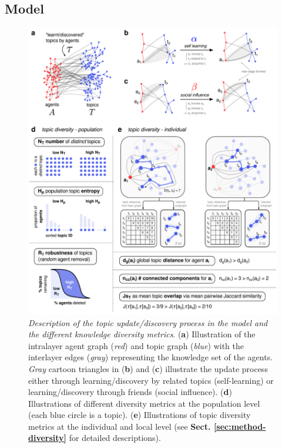 \documentclass{svproc}
\begin{document}
\subsection{Model} \label{sec:method-model}

\begin{figure}[!ht]
    \centering
    \includegraphics[width=\textwidth]{Fig1.pdf}
    \caption{
    \textit{Description of the topic update/discovery process in the model and the different knowledge diversity metrics}.
    (\textbf{a}) Illustration of the intralayer agent graph (\textit{red}) and topic graph (\textit{blue}) with the interlayer edges (\textit{gray}) representing the knowledge set of the agents.
    \textit{Gray} cartoon triangles in (\textbf{b}) and (\textbf{c}) illustrate the update process either through learning/discovery by related topics (self-learning) or learning/discovery through friends (social influence).
    (\textbf{d}) Illustrations of different diversity metrics at the population level (each blue circle is a topic).
    (\textbf{e}) Illustrations of topic diversity metrics at the individual and local level (see \textbf{Sect. \ref{sec:method-diversity}} for detailed descriptions).
    }
    \label{fig:1}
\end{figure}
\end{document}
